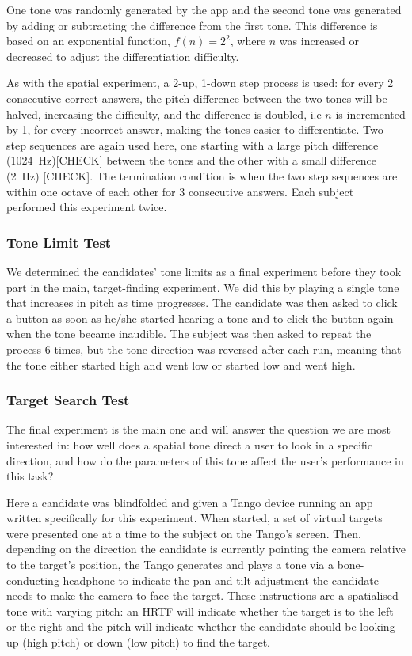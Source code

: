 \documentclass[format=sigconf, review=true, screen=true, anonymous=true]{acmart}
\begin{document}
One tone was randomly generated by the app and the second tone was generated by adding or subtracting the difference from the first tone. This difference is based on an exponential function, $f(n) = 2^2$, where $n$ was increased or decreased to adjust the differentiation difficulty. 

As with the spatial experiment, a 2-up, 1-down step process is used: for every 2 consecutive correct answers, the pitch difference between the two tones will be halved, increasing the difficulty, and the difference is doubled, i.e $n$ is incremented by 1, for every incorrect answer, making the tones easier to differentiate. Two step sequences are again used here, one starting with a large pitch difference (\SI{1024}{\hertz})[CHECK] between the tones and the other with a small difference (\SI{2}{\hertz}) [CHECK]. The termination condition is when the two step sequences are within one octave of each other for 3 consecutive answers. Each subject performed this experiment twice. 

\subsubsection{Tone Limit Test}

We determined the candidates' tone limits as a final experiment before they took part in the  main, target-finding experiment. We did this by playing a single tone that increases in pitch as time progresses. The candidate was then asked to click a button as soon as he/she started hearing a tone and to click the button again when the tone became inaudible. The subject was then asked to repeat the process 6 times, but the tone direction was reversed after each run, meaning that the tone either started high and went low or started low and went high. 

\subsubsection{Target Search Test}

The final experiment is the main one and will answer the question we are most interested in: how well does a spatial tone direct a user to look in a specific direction, and how do the parameters of this tone affect the user's performance in this task? 

Here a candidate was blindfolded and given a Tango device running an app written specifically for this experiment. When started, a set of virtual targets were presented one at a time to the subject on the Tango's screen. Then, depending on the direction the candidate is currently pointing the camera relative to the target's position, the Tango generates and plays a tone via a bone-conducting headphone to indicate the pan and tilt adjustment the candidate needs to make the camera to face the target. These instructions are a spatialised tone with varying pitch: an HRTF will indicate whether the target is to the left or the right and the pitch will indicate whether the candidate should be looking up (high pitch) or down (low pitch) to find the target. 
\end{document}
